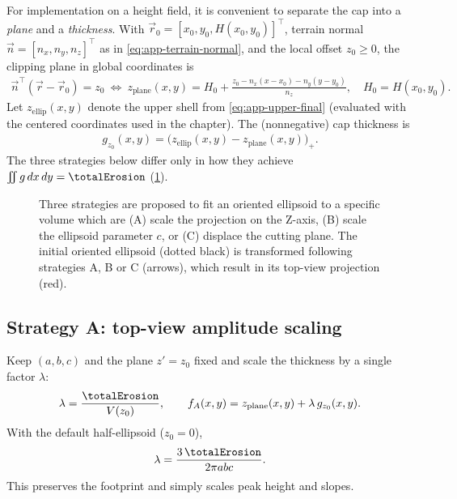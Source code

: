 For implementation on a height field, it is convenient to separate the cap into a \emph{plane} and a \emph{thickness}. With $\vec r_0=[x_0,y_0,H(x_0,y_0)]^\top$, terrain normal $\vec n=[n_x,n_y,n_z]^\top$ as in \cref{eq:app-terrain-normal}, and the local offset $z_0\ge 0$, the clipping plane in global coordinates is
\begin{align}
    \label{eq:app-cap-plane}
    \vec n^\top(\vec r-\vec r_0)=z_0
    \ \Longleftrightarrow\
    z_{\text{plane}}(x,y)=H_0+\frac{z_0-n_x(x-x_0)-n_y(y-y_0)}{n_z},\quad H_0=H(x_0,y_0).
\end{align}
Let $z_{\text{ellip}}(x,y)$ denote the upper shell from \cref{eq:app-upper-final} (evaluated with the centered coordinates used in the chapter). The (nonnegative) cap thickness is
\begin{align}
    \label{eq:app-cap-thickness}
    g_{z_0}(x,y)=\bigl(z_{\text{ellip}}(x,y)-z_{\text{plane}}(x,y)\bigr)_+.
\end{align}
The three strategies below differ only in how they achieve $\iint g\,dx\,dy=\totalErosion$ (\cref{fig:ellipsoid-strategies}).

\begin{figure}
    \caption{Three strategies are proposed to fit an oriented ellipsoid to a specific volume which are (A) scale the projection on the Z-axis, (B) scale the ellipsoid parameter $c$, or (C) displace the cutting plane. The initial oriented ellipsoid (dotted black) is transformed following strategies A, B or C (arrows), which result in its top-view projection (red). }
    \label{fig:ellipsoid-strategies}
\end{figure}

\subsection*{Strategy A: top-view amplitude scaling}
Keep $(a,b,c)$ and the plane $z'=z_0$ fixed and scale the thickness by a single factor $\lambda$:
\begin{align}
    \label{eq:app-stratA}
    \lambda=\frac{\totalErosion}{V(z_0)},\qquad
    f_A(x,y)=z_{\text{plane}}(x,y)+\lambda\,g_{z_0}(x,y).
\end{align}
With the default half-ellipsoid ($z_0=0$),
\begin{align}
    \lambda=\frac{3\,\totalErosion}{2\pi a b c}.
\end{align}
This preserves the footprint and simply scales peak height and slopes.

